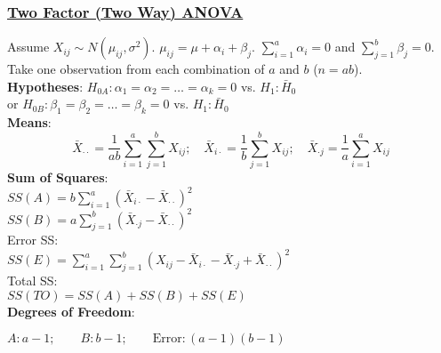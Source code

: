 \documentclass{article}
\begin{document}
\begin{multicols*}{2}
\subsubsection*{\underline{Two Factor (Two Way) ANOVA}}
Assume $X_{ij} \sim N(\mu_{ij}, \sigma^{2})$. $\mu_{ij} = \mu + \alpha_{i} + \beta_{j}$. $\sum_{i=1}^{a} \alpha_{i} = 0$ and $\sum_{j=1}^{b} \beta_{j} = 0$. Take one observation from each combination of $a$ and $b$ ($n = ab$).\\
\textbf{Hypotheses}: $H_{0A}: \alpha_{1} = \alpha_{2} = \dots = \alpha_{k} = 0$ vs. $H_{1}: \bar{H}_{0}$\\
or $H_{0B}: \beta_{1} = \beta_{2} = \dots = \beta_{k} = 0$ vs. $H_{1}: \bar{H}_{0}$\\
\textbf{Means}:
$$\bar{X}_{\cdot \cdot} = \frac{1}{ab} \sum_{i=1}^{a} \sum_{j=1}^{b} X_{ij}; \quad \bar{X}_{i \cdot} = \frac{1}{b} \sum_{j=1}^{b} X_{ij}; \quad \bar{X}_{\cdot j} = \frac{1}{a} \sum_{i=1}^{a} X_{ij}$$
\textbf{Sum of Squares}:\\
$SS(A) = b \sum_{i=1}^{a} (\bar{X}_{i\cdot} - \bar{X}_{\cdot \cdot})^{2}$\\
$SS(B) = a \sum_{j=1}^{b} (\bar{X}_{\cdot j} - \bar{X}_{\cdot \cdot})^{2}$\\
Error SS:\\
$SS(E) = \sum_{i=1}^{a} \sum_{j=1}^{b} (X_{ij} - \bar{X}_{i\cdot} - \bar{X}_{\cdot j} + \bar{X}_{\cdot \cdot})^{2}$\\
Total SS:\\
$SS(TO) = SS(A) + SS(B) + SS(E)$\\
\textbf{Degrees of Freedom}:\\
\centerline{$A: a-1; \qquad B: b-1; \qquad \mbox{Error}: (a-1)(b-1)$}


\end{multicols*}
\end{document}
